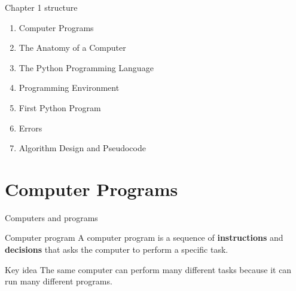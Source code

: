 \documentclass[aspectratio=169,10pt]{beamer}
\begin{document}
\begin{frame}{Chapter 1 structure}
\begin{enumerate}
  \item Computer Programs
  \item The Anatomy of a Computer
  \item The Python Programming Language
  \item Programming Environment
  \item First Python Program
  \item Errors
  \item Algorithm Design and Pseudocode
\end{enumerate}
\end{frame}

\section{Computer Programs}

\begin{frame}{Computers and programs}
\begin{block}{Computer program}
A computer program is a sequence of \textbf{instructions} and \textbf{decisions} that asks the computer to perform a specific task.
\end{block}
\begin{center}
\end{center}
\begin{alertblock}{Key idea}
The same computer can perform many different tasks because it can run many different programs.
\end{alertblock}
\end{frame}
\end{document}
